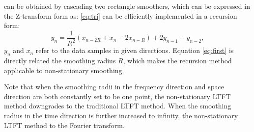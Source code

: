  can be obtained by cascading two rectangle smoothers, which can be expressed in the Z-transform form as:
 \ref{eq:tri} can be efficiently implemented in a recursion form:
\begin{equation}
\label{eq:first}
y_n = \frac{1}{R^2}(x_{n-2R} + x_n - 2x_{n-R}) +2y_{n-1}-y_{n-2},
\end{equation}
 $y_n$ and $x_n$ refer to the data samples in given directions.  Equation \ref{eq:first} is directly related  the smoothing radius $R$, which makes the recursion method applicable to non-stationary smoothing.

Note that when the smoothing radii in the frequency direction and space direction are both constantly set to be one point, the non-stationary  LTFT method downgrades to the traditional LTFT method. When the smoothing radius in the time direction is further increased to  infinity, the non-stationary  LTFT method  to the Fourier transform. 

